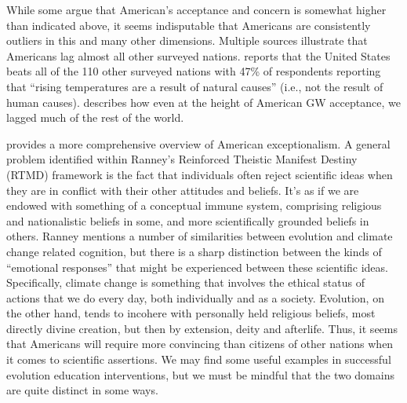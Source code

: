 While some \parencite[e.g.,][]{krosnick_does_2013} argue that American's
acceptance and concern is somewhat higher than indicated above, it seems
indisputable that Americans are consistently outliers in this and many other
dimensions. Multiple sources illustrate that Americans lag almost all other
surveyed nations.  \textcite{ray_worldwide_2010} reports that the United States
beats all of the 110 other surveyed nations with 47\% of respondents reporting
that “rising temperatures are a result of natural causes” (i.e., not the result
of human causes).  \textcite{leiserowitz_international_2007} describes how even
at the height of American GW acceptance, we lagged much of the rest of the
world.



\textcite{ranney_why_2012} provides a more comprehensive overview of American
exceptionalism.  A general problem identified within Ranney's Reinforced
Theistic Manifest Destiny (RTMD) framework is the fact that individuals often
reject scientific ideas when they are in conflict with their other attitudes and
beliefs. It's as if we are endowed with something of a conceptual immune system,
comprising religious and nationalistic beliefs in some, and more scientifically
grounded beliefs in others. Ranney mentions a number of similarities between evolution and
climate change related cognition, but there is a sharp distinction between
the kinds of ``emotional responses'' that might be experienced between these
scientific ideas. Specifically, climate change is something that
involves the ethical status of actions that we do every day, both individually
and as a society. Evolution, on the other hand, tends to incohere with
personally held religious beliefs, most directly divine creation, but then by
extension, deity and afterlife. Thus, it seems that Americans will require more
convincing than citizens of other nations when it comes to scientific
assertions. We may find some useful examples in successful evolution education
interventions, but we must be mindful that the two domains are quite distinct in
some ways.


